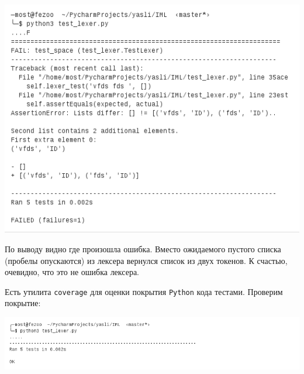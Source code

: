 \documentclass[a4paper,12pt]{article}
\begin{document}
\includegraphics{failed1.png}

\newpage

\par По выводу видно где произошла ошибка. Вместо ожидаемого пустого списка (пробелы опускаются) из лексера вернулся список из двух токенов. К счастью, очевидно, что это не ошибка лексера.

Есть утилита \verb|coverage| для оценки покрытия \verb|Python| кода тестами.
Проверим покрытие:

\includegraphics{coverage.png}
\end{document}
